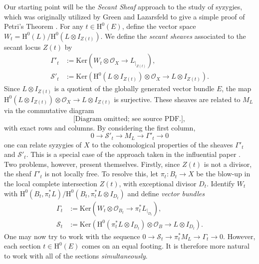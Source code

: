Our starting point will be the \emph{Secant Sheaf} approach to the study of syzygies, which was originally utilized by Green and Lazarsfeld to give a simple proof of Petri's Theorem \cite{green-laz-petri}. For any $t \in \mathrm{H}^0(E)$, define the vector space $W_t = \mathrm{H}^0(L)/ \mathrm{H}^0(L \otimes I_{Z(t)}).$
We define the \emph{secant sheaves} associated to the secant locus $Z(t)$ by
{\small{\begin{align*}
\Gamma'_t &:=\mathrm{Ker}\left(W_t \otimes \mathcal{O}_X \to L_{|_{Z(t)}} \right),\\
\mathcal{S}'_t &:=\mathrm{Ker}\left( \mathrm{H}^0(L \otimes I_{Z(t)}) \otimes \mathcal{O}_X \to L \otimes I_{Z(t)} \right).
\end{align*}}}
Since $L \otimes I_{Z(t)}$ is a quotient of the globally generated vector bundle $E$, the map $\mathrm{H}^0(L \otimes I_{Z(t)}) \otimes \mathcal{O}_X \to L \otimes I_{Z(t)}$ is surjective. These sheaves are related to $M_L$ via the commutative diagram
{\small{$$\text{[Diagram omitted; see source PDF.]},$$}}
with exact rows and columns. By considering the first column,
$$0 \to \mathcal{S}'_t  \to M_L \to \Gamma'_t \to 0$$
one can relate syzygies of $X$ to the cohomological properties of the sheaves $\Gamma'_t$ and $\mathcal{S}'_t$. This is a special case of the approach taken in the influential paper \cite{ein-lazarsfeld-asymptotic}. Two problems, however, present themselves. Firstly, since $Z(t)$ is not a divisor, the sheaf $\Gamma'_t$ is not locally free. To resolve this, let $\pi_t : B_t \to X$ be the blow-up in the local complete intersection $Z(t)$, with exceptional divisor $D_t$. Identify $W_t$ with $\mathrm{H}^0(B_t,\pi_t^*L)/ \mathrm{H}^0(B_t, \pi_t^*L\otimes I_{D_t})$ and define \emph{vector bundles}
{\small{\begin{align*}
\Gamma_t &:=\mathrm{Ker}\left(W_t \otimes \mathcal{O}_{B_t} \to \pi_t^*L_{|_{D_t}} \right),\\
\mathcal{S}_t &:=\mathrm{Ker}\left( \mathrm{H}^0(\pi_t^*L \otimes I_{D_t}) \otimes \mathcal{O}_B \to L \otimes I_{D_t} \right).
\end{align*}}}
One may now try to work with the sequence $0 \to \mathcal{S}_t  \to \pi_t^*M_L \to \Gamma_t \to 0$. However, each section $t \in \mathrm{H}^0(E)$ comes on an equal footing. It is therefore more natural to work with all of the sections \emph{simultaneously}.

